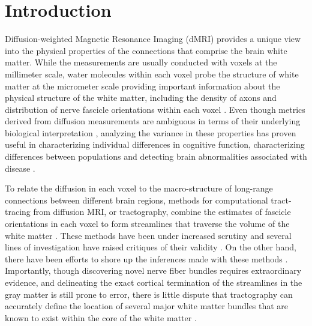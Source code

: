 \section*{Introduction}

Diffusion-weighted Magnetic Resonance Imaging (dMRI) provides a unique view into
the physical properties of the connections that comprise the brain white matter.
While the measurements are usually conducted with voxels at the millimeter
scale, water molecules within each voxel probe the structure of white matter at
the micrometer scale providing important information about the physical
structure of the white matter, including the density of axons and distribution
of nerve fascicle orientations within each voxel \cite{wandell2016clarifying}.
Even though metrics derived from diffusion measurements are ambiguous in terms
of their underlying biological interpretation \cite{Jones2013-xv}, analyzing the
variance in these properties has proven useful in characterizing individual
differences in cognitive function, characterizing differences between
populations and detecting brain abnormalities associated with disease
\cite{Thomason2011-qn}.

To relate the diffusion in each voxel to the macro-structure of long-range
connections between different brain regions, methods for computational
tract-tracing from diffusion MRI, or tractography, combine the estimates of
fascicle orientations in each voxel to form streamlines that traverse the volume
of the white matter \cite{Conturo1999-je, Mori2002-qi}. These methods have been
under increased scrutiny and several lines of investigation have raised
critiques of their validity \cite{Maier-Hein2017-vb, Thomas2014-ki}. On the
other hand, there have been efforts to shore up the inferences made with these
methods \cite{Pestilli2014NatMeth, Takemura2016-sh, Smith2013-nc, Smith2015-cx,
Smith2015-zt, Rheault2018-wk}. Importantly, though discovering novel nerve fiber
bundles requires extraordinary evidence, and delineating the exact cortical
termination of the streamlines in the gray matter is still prone to error, there
is little dispute that tractography can accurately define the location of
several major white matter bundles that are known to exist within the core of
the white matter \cite{Maier-Hein2017-vb}.

